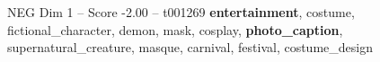 \begin{textsample}{NEG Dim 1 – Score -2.00 – t001269}  \label{ex:f1_neg_003}
\textbf{entertainment}, costume, fictional\_character, demon, mask, cosplay, \textbf{photo\_caption}, supernatural\_creature, masque, carnival, festival, costume\_design

\end{textsample}
